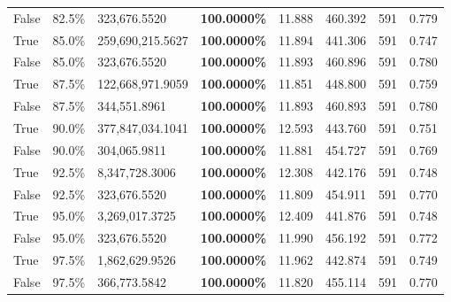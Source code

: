 \begin{table}[H]
\begin{tabular}{lllrllll}
\cline{1-8}
False & 82.5\% & 323,676.5520 & \bfseries \color{red} 100.0000\% & 11.888 & 460.392 & 591 & 0.779 \\
\cline{1-8}
True & 85.0\% & 259,690,215.5627 & \bfseries \color{red} 100.0000\% & 11.894 & 441.306 & 591 & 0.747 \\
\cline{1-8}
False & 85.0\% & 323,676.5520 & \bfseries \color{red} 100.0000\% & 11.893 & 460.896 & 591 & 0.780 \\
\cline{1-8}
True & 87.5\% & 122,668,971.9059 & \bfseries \color{red} 100.0000\% & 11.851 & 448.800 & 591 & 0.759 \\
\cline{1-8}
False & 87.5\% & 344,551.8961 & \bfseries \color{red} 100.0000\% & 11.893 & 460.893 & 591 & 0.780 \\
\cline{1-8}
True & 90.0\% & 377,847,034.1041 & \bfseries \color{red} 100.0000\% & 12.593 & 443.760 & 591 & 0.751 \\
\cline{1-8}
False & 90.0\% & 304,065.9811 & \bfseries \color{red} 100.0000\% & 11.881 & 454.727 & 591 & 0.769 \\
\cline{1-8}
True & 92.5\% & 8,347,728.3006 & \bfseries \color{red} 100.0000\% & 12.308 & 442.176 & 591 & 0.748 \\
\cline{1-8}
False & 92.5\% & 323,676.5520 & \bfseries \color{red} 100.0000\% & 11.809 & 454.911 & 591 & 0.770 \\
\cline{1-8}
True & 95.0\% & 3,269,017.3725 & \bfseries \color{red} 100.0000\% & 12.409 & 441.876 & 591 & 0.748 \\
\cline{1-8}
False & 95.0\% & 323,676.5520 & \bfseries \color{red} 100.0000\% & 11.990 & 456.192 & 591 & 0.772 \\
\cline{1-8}
True & 97.5\% & 1,862,629.9526 & \bfseries \color{red} 100.0000\% & 11.962 & 442.874 & 591 & 0.749 \\
\cline{1-8}
False & 97.5\% & 366,773.5842 & \bfseries \color{red} 100.0000\% & 11.820 & 455.114 & 591 & 0.770 \\
\cline{1-8}
\bottomrule
\end{tabular}
\end{table}
